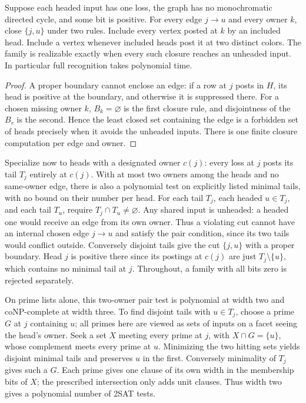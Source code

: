 \begin{corollary}
\label{core:cor:monochromatic-boundary-recognition}
Suppose each headed input has one loss, the graph has no
monochromatic directed cycle, and some bit is positive. For every
edge $j\to u$ and every owner $k$, close $\{j,u\}$ under two rules.
Include every vertex posted at $k$ by an included head. Include a vertex
whenever included heads post it at two distinct colors. The
family is realizable exactly when every such closure reaches an
unheaded input. In particular full recognition takes polynomial time.
\end{corollary}
\begin{proof}
A proper boundary cannot enclose an edge: if a row at $j$ posts in $H$, its
head is positive at the boundary, and otherwise it is suppressed
there. For a chosen missing owner $k$, $B_k=\varnothing$ is the
first closure rule, and disjointness of the $B_r$ is the second.
Hence the least closed set containing the edge is a forbidden set
of heads precisely when it avoids the unheaded inputs. There is one
finite closure computation per edge and owner.
\end{proof}

Specialize now to heads with a designated owner $c(j)$: every loss
at $j$ posts its tail $T_j$ entirely at $c(j)$.
With at most two owners among the heads and no same-owner edge,
there is also a polynomial test on explicitly listed minimal tails,
with no bound on their number per head. For each tail $T_j$, each
headed $u\in T_j$, and each tail $T_u$, require $T_j\cap T_u\ne
\varnothing$. Any shared input is unheaded: a headed one would
receive an edge from its own owner. Thus a violating cut cannot have
an internal chosen edge $j\to u$ and satisfy the pair condition,
since its two tails would conflict outside. Conversely disjoint
tails give the cut $\{j,u\}$ with a proper boundary. Head $j$ is
positive there since its postings at $c(j)$ are just
$T_j\setminus\{u\}$, which contains no minimal tail at $j$.
Throughout, a family with all bits zero is rejected separately.

On prime lists alone, this two-owner pair test is polynomial at
width two and coNP-complete at width three. To find disjoint tails
with $u\in T_j$, choose a prime $G$ at $j$ containing $u$; all
primes here are viewed as sets of inputs on a facet seeing the
head's owner. Seek a set $X$ meeting every prime at $j$, with
$X\cap G=\{u\}$, whose complement meets every prime at $u$.
Minimizing the two hitting sets yields disjoint minimal tails and
preserves $u$ in the first. Conversely minimality of $T_j$ gives
such a $G$. Each prime gives one clause of its own width in the
membership bits of $X$; the prescribed intersection only adds unit
clauses. Thus width two gives a polynomial number of 2SAT tests.

